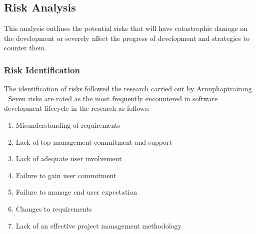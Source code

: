 \documentclass[doc,natbib]{apa6}
\begin{document}
%
%
%

\subsection{Risk Analysis}
This analysis outlines the potential risks that will have catastrophic damage on the development or severely affect the progress of development and strategies to counter them. 

\subsubsection{Risk Identification}\hfil\newline
The identification of risks followed the research carried out by Arnuphaptrairong \citep{Arnuphaptrairong2011}. Seven risks are rated as the most frequently encountered in software development lifecycle in the research as follows:
\begin{enumerate}
	\item Misunderstanding of requirements
	\item Lack of top management commitment and support
	\item Lack of adequate user involvement
	\item Failure to gain user commitment
	\item Failure to manage end user expectation
	\item Changes to requirements
	\item Lack of an effective project management methodology
\end{enumerate}
\end{document}
